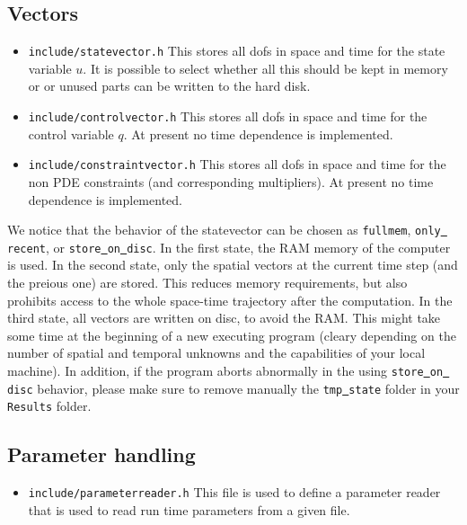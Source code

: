 \subsection{Vectors}
\begin{itemize}
\item \texttt{include/statevector.h} This stores all dofs in space and time for the state 
  variable $u$. It is possible to select whether all this should be kept in memory or 
  or unused parts can be written to the hard disk.
\item \texttt{include/controlvector.h} This stores all dofs in space and time for the 
  control variable $q$. At present no time dependence is implemented.
\item \texttt{include/constraintvector.h} This stores all dofs in space and time for the 
  non PDE constraints (and corresponding multipliers). 
  At present no time dependence is implemented.
\end{itemize}
\begin{remark}
\label{remark_state_behavior}
We notice that the behavior of the statevector can be chosen as 
\texttt{fullmem}, \texttt{only\underline{ }recent}, or 
\texttt{store\underline{ }on\underline{ }disc}. In the
first state, the RAM memory of the computer is used. In the second state,
only the spatial vectors at the current time step (and the preious one)
are stored. This reduces memory requirements, but also prohibits access to the
whole space-time trajectory after the computation.
In the third state,
all vectors are written on disc, to avoid the RAM. This might take some 
time at the beginning of a new executing program (cleary depending 
on the number of spatial and temporal unknowns and the capabilities of your 
local machine). In addition, if the program aborts abnormally in the 
using \texttt{store\underline{ }on\underline{ }disc} behavior, please make 
sure to remove manually the \texttt{tmp\underline{ }state} folder in your 
\texttt{Results} folder. 
\end{remark}


\subsection{Parameter handling}
\begin{itemize}
\item \texttt{include/parameterreader.h} This file is used to define a parameter reader
  that is used to read run time parameters from a given file.
\end{itemize}


